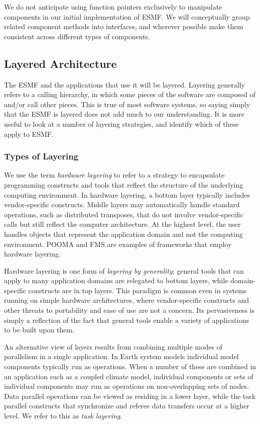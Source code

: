 We do not anticipate using function pointers exclusively to manipulate
components in our initial implementation of ESMF.  We will conceptually
group related component methods into interfaces, and wherever possible 
make them consistent across different types of components.

\subsection{Layered Architecture}

The ESMF and the applications that use it will be layered.  Layering generally 
refers to a calling hierarchy, in which some pieces of the software are composed 
of and/or call other pieces.  This is true of most software systems, so 
saying simply that the ESMF is layered does not add much to our understanding.  
It is more useful to look at a number of layering strategies, 
and identify which of these apply to ESMF.

\subsubsection{Types of Layering}
\label{sec:layering}

We use the term {\it hardware layering} to refer to a strategy to encapsulate 
programming constructs and tools that reflect the structure of the underlying 
computing environment.  In hardware layering, a bottom layer typically includes 
vendor-specific constructs.  Middle layers may automatically 
handle standard operations, such as distributed transposes, that do not involve  
vendor-specific calls but still reflect the computer architecture.  At the highest
level, the user handles objects that represent the application 
domain and not the computing environment.  POOMA and FMS are examples of frameworks
that employ hardware layering.  

Hardware layering is one form of {\it layering by generality}; general 
tools that can apply to many application domains are relegated to bottom layers, 
while domain-specific constructs are in top layers.  This paradigm is
common even in systems running on simple hardware architectures, where 
vendor-specific
constructs and other threats to portability and ease of use are not a concern.
Its pervasiveness is simply a reflection of the fact that general tools 
enable a variety of applications to be built upon them.

An alternative view of layers results from combining multiple modes of parallelism 
in a single application.  In Earth system models individual model 
components typically run as  
operations.  When a number of 
these are combined in an application such as a coupled climate model, individual 
components or sets of individual components may run as  operations 
on non-overlapping sets of nodes.  Data parallel operations can be viewed
as residing in a lower layer, while the task parallel constructs that 
synchronize and referee data transfers occur at a higher level. We refer to 
this as {\it task layering}.


